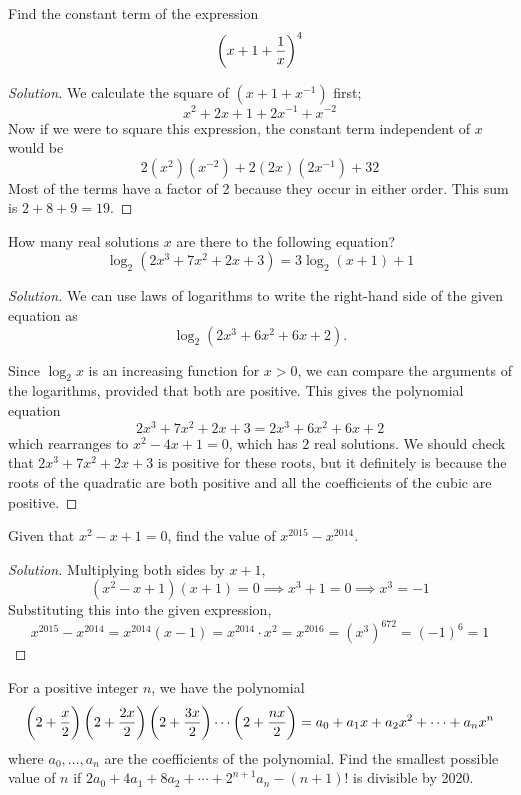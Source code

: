 \begin{prbm}
Find the constant term of the expression
\[\left(x+1+\frac{1}{x}\right)^4\]
\end{prbm}

\begin{proof}[Solution]
We calculate the square of $(x + 1 + x^{-1})$ first;
\[ x^2 + 2x + 1 + 2x^{-1} + x^{-2} \]
Now if we were to square this expression, the constant term independent of $x$ would be
\[ 2(x^2)(x^{-2}) + 2(2x)(2x^{-1}) + 32 \]
Most of the terms have a factor of 2 because they occur in either order. This sum is $2+8+9 = \boxed{19}$.
\end{proof}
\pagebreak

\begin{prbm}
How many real solutions $x$ are there to the following equation?
\[ \log_2(2x^3+7x^2+2x+3) = 3\log_2(x+1)+ 1 \]
\end{prbm}

\begin{proof}[Solution]
We can use laws of logarithms to write the right-hand side of the given equation as
\[ \log_2 (2x^3+6x^2+6x+2). \]

Since $\log_2x$ is an increasing function for $x > 0$, we can compare the arguments of the logarithms, provided that both are positive. This gives the polynomial equation
\[ 2x^3 + 7x^2 + 2x + 3 = 2x^3 + 6x^2 + 6x + 2 \]
which rearranges to $x^2-4x+1=0$, which has $\boxed{2}$ real solutions. We should check that $2x^3+7x^2+2x+3$ is positive for these roots, but it definitely is because the roots of the quadratic are both positive and all the coefficients of the cubic are positive.
\end{proof}
\pagebreak

\begin{prbm}[CHINA 1979]
Given that $x^2-x+1=0$, find the value of $x^{2015}-x^{2014}$. 
\end{prbm}

\begin{proof}[Solution]
Multiplying both sides by $x+1$,
\[ (x^2-x+1)(x+1) = 0 \implies x^3 + 1 = 0 \implies x^3 = -1 \]
Substituting this into the given expression,
\[ x^{2015} - x^{2014} = x^{2014} (x-1) = x^{2014} \cdot x^2 = x^{2016} = (x^3)^{672} = (-1)^6 = \boxed{1} \]
\end{proof}
\pagebreak

\begin{prbm}[DOKA]
For a positive integer $n$, we have the polynomial
\[ \left(2+\frac{x}{2}\right)\left(2+\frac{2x}{2}\right)\left(2+\frac{3x}{2}\right)\cdots\left(2+\frac{nx}{2}\right) = a_0+a_1x+a_2x^2+\cdots+a_nx^n \]
where $a_0,\dots,a_n$ are the coefficients of the polynomial. Find the smallest possible value of $n$ if $2a_0+4a_1+8a_2+\cdots+2^{n+1}a_n-(n+1)!$ is divisible by 2020.
\end{prbm}

